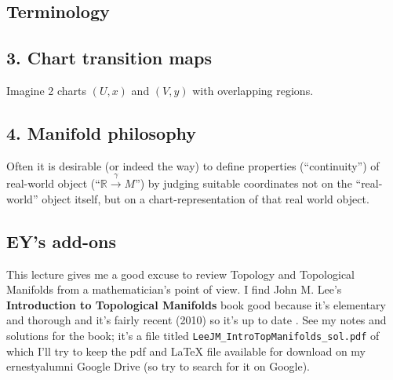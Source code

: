 \documentclass[10pt]{amsart}
\begin{document}
\begin{multicols*}{2}
\subsection{Terminology}

\subsection{3. Chart transition maps}

Imagine 2 charts $(U,x)$ and $(V,y)$ with overlapping regions.  

\subsection{4. Manifold philosophy}

Often it is desirable (or indeed the way) to define properties (``continuity'') of real-world object (``$\mathbb{R}\xrightarrow{ \gamma } M$'') by judging suitable coordinates not on the ``real-world'' object itself, but on a chart-representation of that real world object.  

\subsection*{EY's add-ons}

This lecture gives me a good excuse to review Topology and Topological Manifolds from a mathematician's point of view.  I find John M. Lee's \textbf{Introduction to Topological Manifolds} book good because it's elementary and thorough and it's fairly recent (2010) so it's up to date \cite{JMLee2010}.  See my notes and solutions for the book; it's a file titled \verb|LeeJM_IntroTopManifolds_sol.pdf| of which I'll try to keep the pdf and LaTeX file available for download on my ernestyalumni Google Drive (so try to search for it on Google).  



\end{multicols*}
\end{document}
